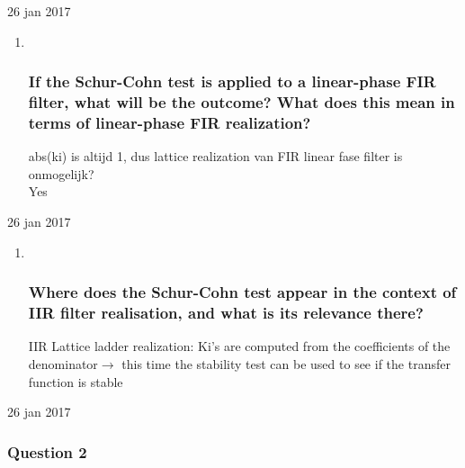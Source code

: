\documentclass[
  a4paper,
  ,captions=tableheading
]{scrartcl}
\begin{document}
26 jan 2017

\begin{enumerate}
\def\labelenumi{\arabic{enumi}.}
\setcounter{enumi}{2}
\item ~
  \subsubsection{If the Schur-Cohn test is applied to a linear-phase FIR
  filter, what will be the outcome? What does this mean in terms of
  linear-phase FIR
  realization?}\label{if-the-schur-cohn-test-is-applied-to-a-linear-phase-fir-filter-what-will-be-the-outcome-what-does-this-mean-in-terms-of-linear-phase-fir-realization}

  abs(ki) is altijd 1, dus lattice realization van FIR linear fase
  filter is onmogelijk?\\
  Yes
\end{enumerate}

26 jan 2017

\begin{enumerate}
\def\labelenumi{\arabic{enumi}.}
\setcounter{enumi}{3}
\item ~
  \subsubsection{Where does the Schur-Cohn test appear in the context of
  IIR filter realisation, and what is its relevance
  there?}\label{where-does-the-schur-cohn-test-appear-in-the-context-of-iir-filter-realisation-and-what-is-its-relevance-there}

  IIR Lattice ladder realization: Ki's are computed from the
  coefficients of the denominator\(\rightarrow\) this time the stability
  test can be used to see if the transfer function is stable
\end{enumerate}

26 jan 2017

\subsubsection{Question 2}\label{question-2-6}
\end{document}
